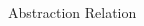 \documentclass[final,hyperref={pdfpagelabels=false}]{beamer}
\begin{document}
\begin{frame}{}
\begin{columns}[t]
\begin{column}{.993\linewidth}
\begin{block}{Abstraction Relation}
\begin{columns}[t]
\begin{column}{.24\linewidth}
              \end{column}
              \vrule{}
              \begin{column}{.65\linewidth}
%              
%               
%                 
%                                  
%                   
%                    
%                  
%  	            
%                 
%                  

\end{column}
\end{columns}
\end{block}
\end{column}
\end{columns}
\end{frame}
\end{document}
